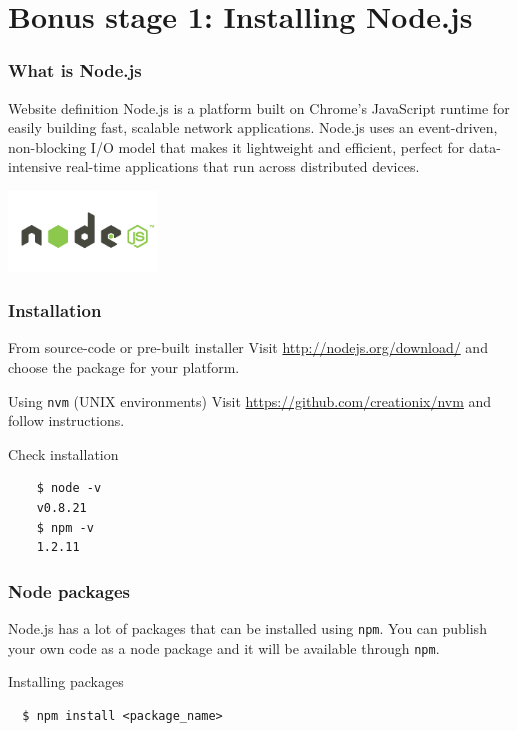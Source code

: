 \section{Bonus stage 1: Installing Node.js}

\begin{frame}[fragile]
\end{frame}

\begin{frame}[fragile]
  \frametitle{What is Node.js}
  \begin{block}{Website definition}
    Node.js is a platform built on Chrome's JavaScript runtime for easily building fast, scalable network applications. Node.js uses an event-driven, non-blocking I/O model that makes it lightweight and efficient, perfect for data-intensive real-time applications that run across distributed devices.
  \end{block}

  \begin{center}
    \includegraphics[width=150px]{images/nodejs.png}
  \end{center}
\end{frame}

\begin{frame}[fragile]
  \frametitle{Installation}
  \begin{block}{From source-code or pre-built installer}
    Visit \url{http://nodejs.org/download/} and choose the package for your platform.
  \end{block}

  \pause

  \begin{block}{Using \texttt{nvm} (UNIX environments)}
    Visit \url{https://github.com/creationix/nvm} and follow instructions.
  \end{block}

  \pause

  \begin{block}{Check installation}
    {\scriptsize
    \begin{verbatim}
    $ node -v
    v0.8.21
    $ npm -v
    1.2.11
    \end{verbatim}
    }
  \end{block}
\end{frame}

\begin{frame}[fragile]
  \frametitle{Node packages}

  Node.js has a lot of packages that can be installed using \texttt{npm}. 
  You can publish your own code as a node package and it will be available through \texttt{npm}.

  \pause

  \begin{block}{Installing packages}
  {\scriptsize
  \begin{verbatim}
  $ npm install <package_name>
  \end{verbatim}
  }
  \end{block}
\end{frame}

